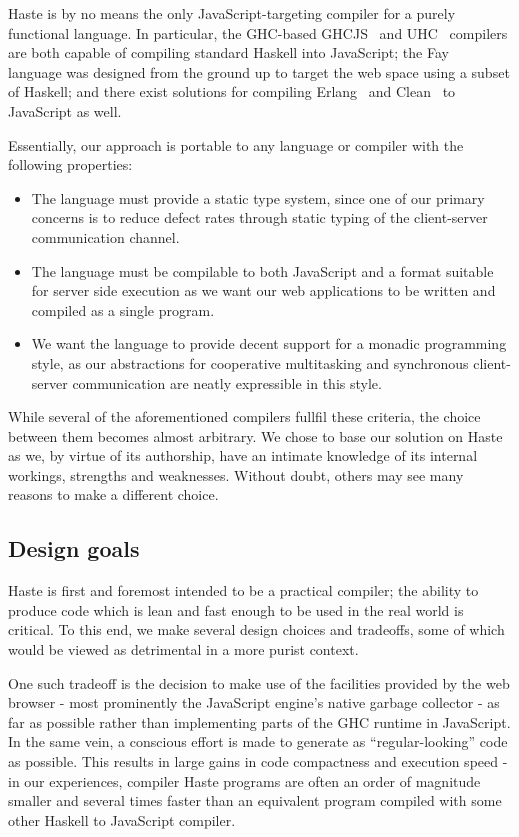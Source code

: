 \documentclass[preprint]{sigplanconf}
\begin{document}
Haste is by no means the only JavaScript-targeting compiler for a purely
functional language. In particular, the GHC-based GHCJS\ \cite{ghcjs} and
UHC\ \cite{uhc} compilers are both capable of compiling standard Haskell into
JavaScript; the Fay\ \cite{fay} language was designed from the ground up to
target the web space using a subset of Haskell; and there exist solutions for
compiling Erlang\ \cite{jserlang} and Clean\ \cite{jsclean} to JavaScript as
well.

Essentially, our approach is portable to any language or compiler with the
following properties:

\begin{itemize}
  \item The language must provide a static type system, since one of our
        primary concerns is to reduce defect rates through static typing of
        the client-server communication channel.
  \item The language must be compilable to both JavaScript and a format
        suitable for server side execution as we want our web applications
        to be written and compiled as a single program.
  \item We want the language to provide decent support for a monadic
        programming style, as our abstractions for cooperative multitasking
        and synchronous client-server communication are neatly expressible in
        this style.
\end{itemize}

While several of the aforementioned compilers fullfil these criteria, the
choice between them becomes almost arbitrary. We chose to base our solution on
Haste as we, by virtue of its authorship, have an intimate knowledge of its
internal workings, strengths and weaknesses. Without doubt, others may see many
reasons to make a different choice.

\subsection{Design goals}

Haste is first and foremost intended to be a practical compiler; the ability
to produce code which is lean and fast enough to be used in the real world is
critical. To this end, we make several design choices and tradeoffs, some of
which would be viewed as detrimental in a more purist context.

One such tradeoff is the decision to make use of the facilities provided by the
web browser - most prominently the JavaScript engine's native garbage
collector - as far as possible rather than implementing parts of the GHC
runtime in JavaScript. In the same vein, a conscious effort is made to generate
as ``regular-looking'' code as possible. This results in large gains in code
compactness and execution speed - in our experiences, compiler Haste programs
are often an order of magnitude smaller and several times faster than an
equivalent program compiled with some other Haskell to JavaScript compiler.
\end{document}
